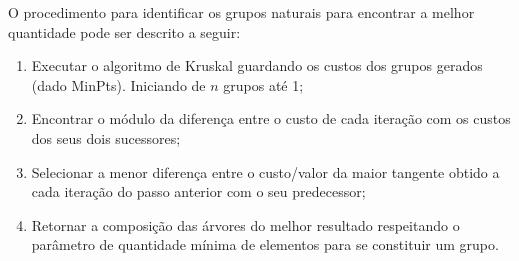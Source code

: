 \begin{figure}[!ht]
	\centering
\end{figure}

O procedimento para identificar os grupos naturais para encontrar a melhor quantidade pode ser descrito a seguir:
 \begin{enumerate}
\item Executar o algoritmo de Kruskal guardando os custos dos grupos gerados (dado MinPts). Iniciando de ${n}$ grupos até 1;
\item Encontrar o módulo da diferença entre o custo de cada iteração com os custos dos seus dois sucessores;
\item Selecionar a menor diferença entre o custo/valor da maior tangente obtido a cada iteração do passo anterior com o seu predecessor;
\item Retornar a composição das árvores do melhor resultado respeitando o parâmetro de quantidade mínima de elementos para se constituir um grupo.
\end{enumerate}

